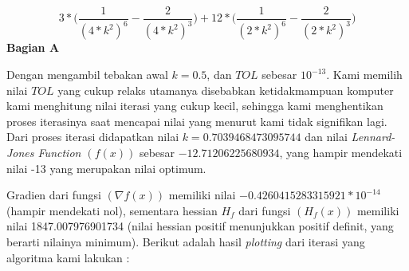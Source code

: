 \documentclass[11pt]{article}
\begin{document}
\[
3 * \bigg(\frac{1}{(4*k^2)^6} - \frac{2}{(4*k^2)^3}\bigg) + 12 * \bigg(\frac{1}{(2*k^2)^6} - \frac{2}{(2*k^2)^3}\bigg)
\]
\newline
\newline
\textbf{Bagian A}

\medskip

Dengan mengambil tebakan awal $k = 0.5$, dan $TOL$ sebesar $10^{-13}$. Kami memilih nilai $TOL$ yang cukup relaks utamanya disebabkan ketidakmampuan komputer kami menghitung nilai iterasi yang cukup kecil, sehingga kami menghentikan proses iterasinya saat mencapai nilai yang menurut kami tidak signifikan lagi. Dari proses iterasi didapatkan nilai $k = 0.7039468473095744$ dan nilai \textit{Lennard-Jones Function $(f(x))$} sebesar $-12.71206225680934$, yang hampir mendekati nilai -13 yang merupakan nilai optimum.

\medskip

Gradien dari fungsi $(∇f(x))$  memiliki nilai $-0.4260415283315921*10^{-14}$ (hampir mendekati nol), sementara hessian $H_{f}$ dari fungsi $(H_{f}(x))$ memiliki nilai 1847.007976901734 (nilai hessian positif menunjukkan positif definit, yang berarti nilainya minimum). Berikut adalah hasil \textit{plotting} dari iterasi yang algoritma kami lakukan :
\end{document}
